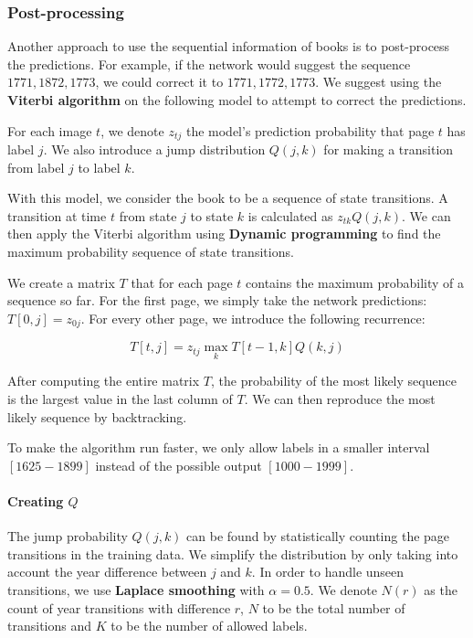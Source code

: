 \subsubsection{Post-processing}

Another approach to use the sequential information of books is to post-process the predictions. For example, if the network would suggest the sequence $1771, 1872, 1773$, we could correct it to $1771, 1772, 1773$. We suggest using the \textbf{Viterbi algorithm} on the following model to attempt to correct the predictions.

For each image $t$, we denote $z_{tj}$ the model's prediction probability that page $t$ has label $j$. We also introduce a jump distribution $Q(j, k)$ for making a transition from label $j$ to label $k$.

With this model, we consider the book to be a sequence of state transitions. A transition at time $t$ from state $j$ to state $k$ is calculated as $z_{tk} Q(j, k)$. We can then apply the Viterbi algorithm using \textbf{Dynamic programming} to find the maximum probability sequence of state transitions.

We create a matrix $T$ that for each page $t$ contains the maximum probability of a sequence so far. For the first page, we simply take the network predictions: $T[0,j] = z_{0j}$. For every other page, we introduce the following recurrence:

\[
T[t,j] = z_{tj} \max_k{ T[t-1,k] Q(k, j) }
\]

After computing the entire matrix $T$, the probability of the most likely sequence is the largest value in the last column of $T$. We can then reproduce the most likely sequence by backtracking.

To make the algorithm run faster, we only allow labels in a smaller interval $[1625-1899]$ instead of the possible output $[1000-1999]$.

\paragraph{Creating $Q$}
The jump probability $Q(j, k)$ can be found by statistically counting the page transitions in the training data. We simplify the distribution by only taking into account the year difference between $j$ and $k$. In order to handle unseen transitions, we use \textbf{Laplace smoothing} with $\alpha=0.5$. We denote $N(r)$ as the count of year transitions with difference $r$, $N$ to be the total number of transitions and $K$ to be the number of allowed labels.

